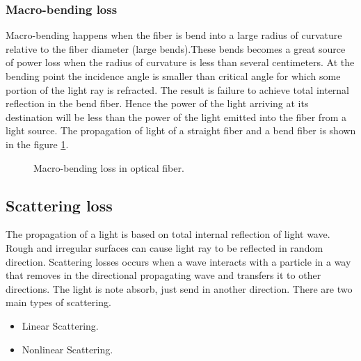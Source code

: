 \documentclass[12pt]{report}
\begin{document}
	\subsubsection{Macro-bending loss}
	Macro-bending happens when the fiber is bend into a large radius of curvature relative to the fiber diameter (large bends).These bends becomes a great source of power loss when the radius of curvature is less than several centimeters. At the bending point the incidence angle is smaller than critical angle for which some portion of the light ray is refracted. The result is failure to achieve total internal reflection in the bend fiber. Hence the power of the light arriving at its destination will be less than the power of the light emitted into the fiber from a light source. The propagation of light of a straight fiber and a bend fiber is shown in the figure \ref{fig:macro-bending}. 
	\begin{figure}[htbp]
		\caption{Macro-bending loss in optical fiber.}
		\label{fig:macro-bending}
	\end{figure}
	

	
	\subsection{ Scattering loss}
	The propagation of a light is based on total internal reflection of light wave. Rough and irregular surfaces can cause light ray to be reflected in random direction. Scattering losses occurs when a wave interacts with a particle in a way that removes in the directional propagating wave and transfers it to other directions. The light is note absorb, just send in another direction. There are two main types of scattering.\\ 
	\begin{itemize}
		\item Linear Scattering.
		\item Nonlinear Scattering.\\
	\end{itemize}
\end{document}
